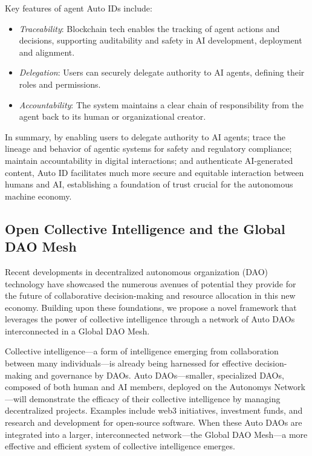 \documentclass[conference]{IEEEtran}
\begin{document}
Key features of agent Auto IDs include:
\begin{itemize}
    \item \textit{Traceability}: Blockchain tech enables the tracking of agent actions and decisions, supporting auditability and safety in AI development, deployment and alignment.
    \item \textit{Delegation}: Users can securely delegate authority to AI agents, defining their roles and permissions.
    \item \textit{Accountability}: The system maintains a clear chain of responsibility from the agent back to its human or organizational creator.
\end{itemize}

In summary, by enabling users to delegate authority to AI agents; trace the lineage and behavior of agentic systems for safety and regulatory compliance; maintain accountability in digital interactions; and authenticate AI-generated content, Auto ID facilitates much more secure and equitable interaction between humans and AI, establishing a foundation of trust crucial for the autonomous machine economy.

\subsection{Open Collective Intelligence and the Global DAO Mesh}

Recent developments in decentralized autonomous organization (DAO) technology have showcased the numerous avenues of potential they provide for the future of collaborative decision-making and resource allocation\cite{dao} in this new economy. Building upon these foundations, we propose a novel framework that leverages the power of collective intelligence through a network of Auto DAOs interconnected in a Global DAO Mesh.

Collective intelligence—a form of intelligence emerging from collaboration between many individuals—is already being harnessed for effective decision-making and governance by DAOs. Auto DAOs—smaller, specialized DAOs, composed of both human and AI members, deployed on the Autonomys Network—will demonstrate the efficacy of their collective intelligence by managing decentralized projects. Examples include web3 initiatives, investment funds, and research and development for open-source software. When these Auto DAOs are integrated into a larger, interconnected network—the Global DAO Mesh—a more effective and efficient system of collective intelligence emerges.
\end{document}
